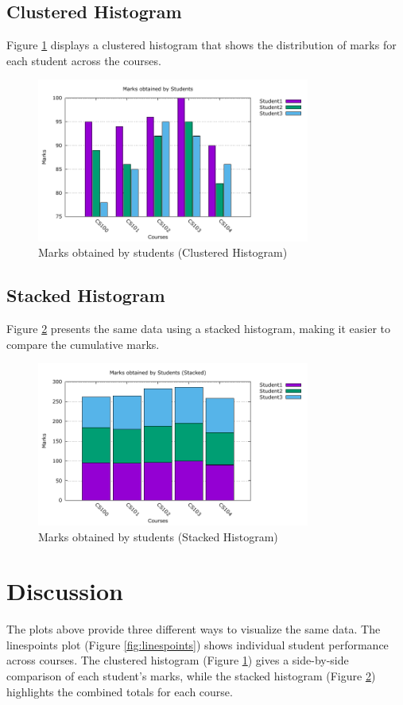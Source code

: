 \documentclass{article}
\begin{document}
\subsection{Clustered Histogram}
Figure \ref{fig:histogram} displays a clustered histogram that shows the distribution of marks for each student across the courses.

\begin{figure}[H]
    \centering
    \includegraphics[width=0.8\textwidth]{histogram.pdf}
    \caption{Marks obtained by students (Clustered Histogram)}
    \label{fig:histogram}
\end{figure}

\subsection{Stacked Histogram}
Figure \ref{fig:stacked} presents the same data using a stacked histogram, making it easier to compare the cumulative marks.

\begin{figure}[H]
    \centering
    \includegraphics[width=0.8\textwidth]{stacked_histogram.pdf}
    \caption{Marks obtained by students (Stacked Histogram)}
    \label{fig:stacked}
\end{figure}

\FloatBarrier

\section{Discussion}
The plots above provide three different ways to visualize the same data. The linespoints plot (Figure \ref{fig:linespoints}) shows individual student performance across courses. The clustered histogram (Figure \ref{fig:histogram}) gives a side-by-side comparison of each student's marks, while the stacked histogram (Figure \ref{fig:stacked}) highlights the combined totals for each course.
\end{document}
